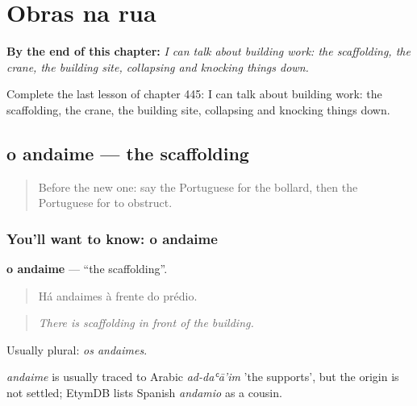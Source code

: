 
\chapter{Obras na rua}
\label{ch:pt-obras-na-rua}

\begin{chapteropening}
\textbf{By the end of this chapter:} \emph{I can talk about building work: the scaffolding, the crane, the building site, collapsing and knocking things down.}

Complete the last lesson of chapter 445: I can talk about building work: the scaffolding, the crane, the building site, collapsing and knocking things down.
\end{chapteropening}

\section[o andaime]{o andaime — the scaffolding}

\label{lesson:PT-C445-andaime}



\begin{quote}
Before the new one: say the Portuguese for the bollard, then the Portuguese for to obstruct.
\end{quote}

\subsection*{You'll want to know: o andaime}
\textbf{o andaime} — \textquotedblleft{}the scaffolding\textquotedblright{}.

\begin{quote}
Há andaimes à frente do prédio.
\end{quote}

\begin{quote}
\emph{There is scaffolding in front of the building.}
\end{quote}

Usually plural: \emph{os andaimes}.

\begin{cousinweb}
\emph{andaime} is usually traced to Arabic \emph{ad-daʿā'im} 'the supports', but the origin is not settled; EtymDB lists Spanish \emph{andamio} as a cousin.
\end{cousinweb}

